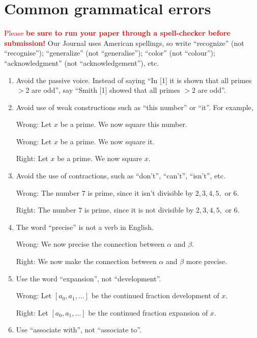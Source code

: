 \documentclass[12pt]{article}
\begin{document}
\section{Common grammatical errors}

\textcolor{red}{Please {\bf be sure to run your paper through a spell-checker before
submission!}}  Our Journal uses American spellings, so write
``recognize'' (not ``recognise'');
``generalize'' (not ``generalise''); ``color'' (not ``colour'');
``acknowledgment'' (not ``acknowledgement''), etc.

\begin{enumerate}

\item Avoid the passive voice.  Instead of saying ``In
[1] it is shown that all primes $> 2$ are odd'', say ``Smith [1] showed
that all primes $>2$ are odd''.

\item Avoid use of weak constructions such as ``this number'' or
``it''.  For example,

Wrong:  Let $x$ be a prime.  We now square this number.

Wrong:  Let $x$ be a prime.  We now square it.

Right:  Let $x$ be a prime.  We now square $x$.

\item Avoid the use of contractions, such as ``don't'', ``can't'',
``isn't'', etc.

Wrong:  The number $7$ is prime, since it isn't divisible by
$2, 3, 4, 5, $ or $6$.  

Right:  The number $7$ is prime, since it is not divisible by
$2, 3, 4, 5, $ or $6$.

\item The word ``precise'' is not a verb in English.

Wrong:  We now precise the connection between 
$\alpha$ and $\beta$.

Right:  We now make the connection between
$\alpha$ and $\beta$ more precise.

\item Use the word ``expansion'', not ``development''.

Wrong:  Let $[a_0, a_1, \ldots]$ be the continued fraction
development of $x$.

Right:  Let $[a_0, a_1, \ldots]$ be the continued fraction
expansion of $x$.

\item Use ``associate with'', not ``associate to''.


\end{enumerate}
\end{document}
